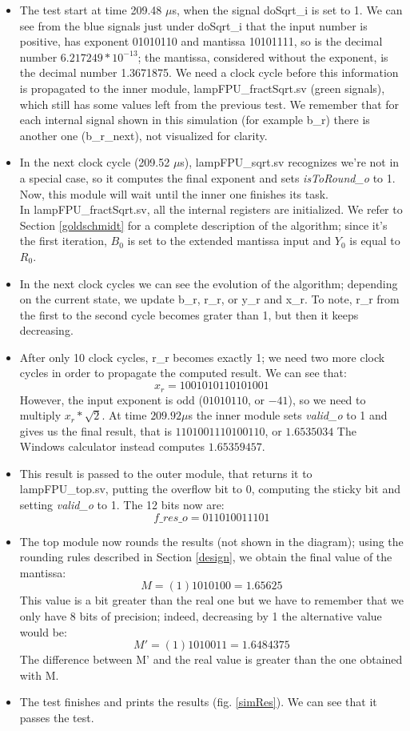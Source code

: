 \begin{itemize}
\item The test start at time 209.48 $\mu$s, when the signal doSqrt\_i is set to 1. We can see from the blue signals just under doSqrt\_i that the input number is positive, has exponent 01010110 and mantissa 10101111, so is the decimal number $6.217249*10^{-13}$; the mantissa, considered without the exponent, is the decimal number 1.3671875. We need a clock cycle before this information is propagated to the inner module, lampFPU\_fractSqrt.sv (green signals), which still has some values left from the previous test. We remember that for each internal signal shown in this simulation (for example b\_r) there is another one (b\_r\_next), not visualized for clarity.
\item In the next clock cycle (209.52 $\mu$s), lampFPU\_sqrt.sv recognizes we're not in a special case, so it computes the final exponent and sets \emph{isToRound\_o} to 1. Now, this module will wait until the inner one finishes its task.\\
In lampFPU\_fractSqrt.sv, all the internal registers are initialized. We refer to Section \ref{goldschmidt} for a complete description of the algorithm; since it's the first iteration, $B_0$ is set to the extended mantissa input and $Y_0$ is equal to $R_0$. 
\item In the next clock cycles we can see the evolution of the algorithm; depending on the current state, we update b\_r, r\_r, or y\_r and x\_r. To note, r\_r from the first to the second cycle becomes grater than 1, but then it keeps decreasing.
\item After only 10 clock cycles, r\_r becomes exactly 1; we need two more clock cycles in order to propagate the computed result. We can see that: 
$$x_r = 1001010110101001$$However, the input exponent is odd ($01010110$, or $-41$), so we need to multiply
$x_r * \sqrt{2}$. At time $209.92 \mu$s the inner module sets \emph{valid\_o} to 1 and gives us the final result, that is $1101001110100110$, or $1.6535034$ The Windows calculator instead computes $1.65359457$. 
\item This result is passed to the outer module, that returns it to lampFPU\_top.sv, putting the overflow bit to 0, computing the sticky bit and setting \emph{valid\_o} to 1. The 12 bits now are:
$$f\_res\_o = 011010011101$$ 
\item The top module now rounds the results (not shown in the diagram); using the rounding rules described in Section \ref{design}, we obtain the final value of the mantissa:
$$ M = (1)1010100 = 1.65625$$
This value is a bit greater than the real one but we have to remember that we only have 8 bits of precision; indeed, decreasing by 1 the alternative value would be:
 $$ M' = (1)1010011 =1.6484375$$
The difference between M' and the real value is greater than the one obtained with M.
\item The test finishes and prints the results (fig. \ref{simRes}). We can see that it passes the test.
\end{itemize}
